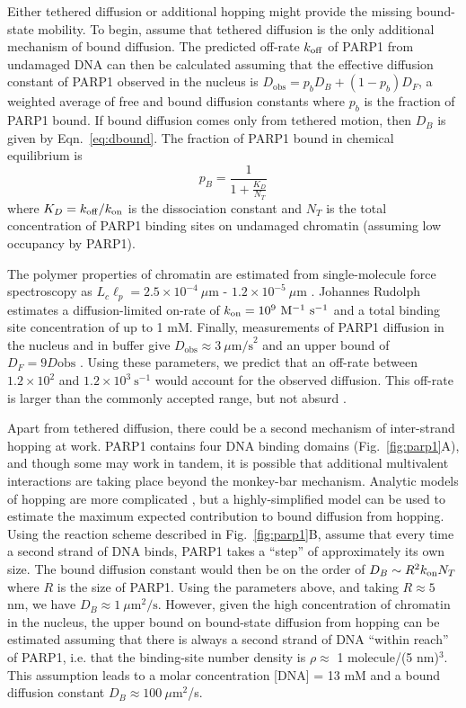 Either tethered diffusion or additional hopping might provide the missing bound-state mobility.  To begin, assume that tethered diffusion is the only additional mechanism of bound diffusion.  The predicted off-rate $k_{\rm off}$ of PARP1 from undamaged DNA can then be calculated assuming that the effective diffusion constant of PARP1 observed in the nucleus is $D_\mathrm{obs} = p_b D_B + (1-p_b)D_F$, a weighted average of free and bound diffusion constants where $p_b$ is the fraction of PARP1 bound.  If bound diffusion comes only from tethered motion, then $D_B$ is given by Eqn.~\ref{eq:dbound}.  The fraction of PARP1 bound in chemical equilibrium is 
\begin{equation}
p_B = \frac{1}{1+\frac{K_D}{N_T}} 
\end{equation} where $K_D = k_{\rm off}/k_{\rm on}$ is the dissociation constant and $N_T$ is the total concentration of PARP1 binding sites on undamaged chromatin (assuming low occupancy by PARP1).

The polymer properties of chromatin are estimated from single-molecule force spectroscopy as $L_c\ell_p = 2.5\times10^{-4}\ \mu$m  - $1.2\times 10^{-5}\ \mu$m \cite{kruithof09, norouzi18}.  Johannes Rudolph estimates a diffusion-limited on-rate of $\kon = 10^{9}\ \mathrm{M}^{-1}\ \mathrm{s}^{-1}$ and a total binding site concentration of up to 1 mM.  Finally, measurements of PARP1 diffusion in the nucleus and in buffer give $D_\mathrm{obs} \approx 3\ \mu\mathrm{m/s}^2$ and an upper bound of $D_F = 9D\mathrm{obs}$ \cite{mahadevan18}.  Using these parameters, we predict that an off-rate between $1.2\times 10^2$ and $1.2\times 10^3\ \mathrm{s}^{-1}$ would account for the observed diffusion.  This off-rate is larger than the commonly accepted range, but not absurd \cite{rudolph18}.

Apart from tethered diffusion, there could be a second mechanism of inter-strand hopping at work.  PARP1 contains four DNA binding domains (Fig.~\ref{fig:parp1}A), and though some may work in tandem, it is possible that additional multivalent interactions are taking place beyond the monkey-bar mechanism.  Analytic models of hopping are more complicated \cite{yang18}, but a highly-simplified model can be used to estimate the maximum expected contribution to bound diffusion from hopping.  Using the reaction scheme described in Fig.~\ref{fig:parp1}B, assume that every time a second strand of DNA binds, PARP1 takes a ``step'' of approximately its own size.  The bound diffusion constant would then be on the order of $D_B \sim R^2 k_{\rm on} N_T$ where $R$ is the size of PARP1.  Using the parameters above, and taking $R \approx 5$ nm, we have $D_B \approx 1\ \mu\mathrm{m}^2/\mathrm{s}$.  However, given the high concentration of chromatin in the nucleus, the upper bound on bound-state diffusion from hopping can be estimated assuming that there is always a second strand of DNA ``within reach'' of PARP1, i.e. that the binding-site number density is $\rho \approx $ 1 molecule/(5 nm)$^3$.  This assumption leads to a molar concentration [DNA] = 13 mM and a bound diffusion constant $D_B \approx  100\ \mu$m$^2$/s.

